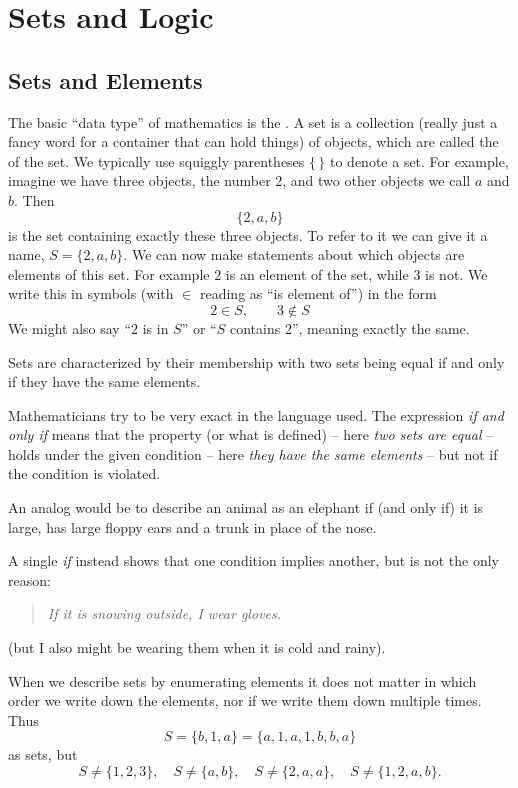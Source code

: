 \chapter{Sets and Logic}
\label{chsets}

\section{Sets and Elements}

The basic ``data type'' of mathematics is the . A set is a
collection (really just a fancy word for a container that can hold things)
of objects, which are called the  of the set.
We typically use squiggly parentheses $\{\,\}$ to denote a set.
For example,
imagine we have three objects, the number 2, and two other objects we call
$a$ and $b$. Then
\[
\{2,a,b\}
\]
is the set containing exactly these three objects. To refer to it we can give it
a name, $S=\{2,a,b\}$.
We can now make statements about which objects are elements of this set. For
example $2$ is an element of the set, while $3$ is not. We write this in
symbols (with $\in$ reading as ``is element of'') in the form
\[
2\in S,\qquad 3\not\in S
\]
We might also say ``$2$ is in $S$'' or ``$S$ contains $2$'', meaning exactly
the same.

Sets are characterized by their membership with two sets being equal if and
only if they have the same elements.
\begin{note}
Mathematicians try to be very exact in the language used. The expression {\em if
and only if} means that the property (or what is defined) -- here {\em two
sets are equal} -- holds under the given condition -- here {\em they have the same
elements} -- but not if the condition is violated.

An analog would be to describe an animal as an elephant if (and only if) it
is large, has large floppy ears and a trunk in place of the nose.
\medskip

A single {\em if} instead shows that one condition implies another, but is
not the only reason:
\begin{quote}
{\em If it is snowing outside, I wear gloves.}
\end{quote}
(but I also might be wearing them when it is cold and rainy).
\end{note}
When we describe sets
by enumerating elements it does not matter in which order we write down the
elements, nor if we write them down multiple times.
Thus
\[
S=\{b,1,a\}=\{a,1,a,1,b,b,a\}
\]
as sets, but
\[
S\not=\{1,2,3\},\quad S\not=\{a,b\},\quad S\not=\{2,a,a\},\quad
S\not=\{1,2,a,b\}.
\]

